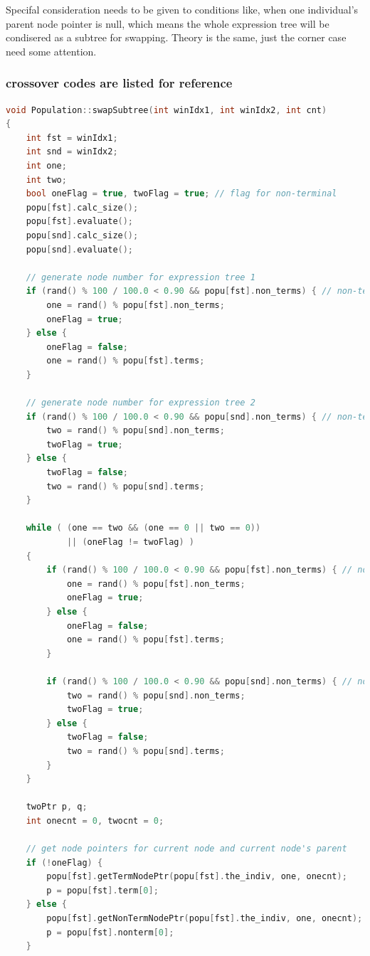 \documentclass[10pt,b5paper]{article}
\begin{document}
Specifal consideration needs to be given to conditions like, when one individual's parent node pointer is null, which means the whole expression tree will be condisered as a subtree for swapping. Theory is the same, just the corner case need some attention. 
\subsubsection{crossover codes are listed for reference}
\label{sec-1-3-2}
\begin{lstlisting}[language=c++]
void Population::swapSubtree(int winIdx1, int winIdx2, int cnt) 
{
    int fst = winIdx1;
    int snd = winIdx2;
    int one;
    int two;
    bool oneFlag = true, twoFlag = true; // flag for non-terminal
    popu[fst].calc_size();
    popu[fst].evaluate();
    popu[snd].calc_size();
    popu[snd].evaluate();

    // generate node number for expression tree 1
    if (rand() % 100 / 100.0 < 0.90 && popu[fst].non_terms) { // non-terminal swap
        one = rand() % popu[fst].non_terms;
        oneFlag = true;  
    } else {    
        oneFlag = false;
        one = rand() % popu[fst].terms;
    }

    // generate node number for expression tree 2
    if (rand() % 100 / 100.0 < 0.90 && popu[snd].non_terms) { // non-terminal swap
        two = rand() % popu[snd].non_terms;
        twoFlag = true;
    } else {    
        twoFlag = false;
        two = rand() % popu[snd].terms;
    }
    
    while ( (one == two && (one == 0 || two == 0))
            || (oneFlag != twoFlag) )
    {
        if (rand() % 100 / 100.0 < 0.90 && popu[fst].non_terms) { // non-terminal swap
            one = rand() % popu[fst].non_terms;
            oneFlag = true;
        } else {    
            oneFlag = false;
            one = rand() % popu[fst].terms;
        }
    
        if (rand() % 100 / 100.0 < 0.90 && popu[snd].non_terms) { // non-terminal swap
            two = rand() % popu[snd].non_terms;
            twoFlag = true;
        } else {    
            twoFlag = false;
            two = rand() % popu[snd].terms;
        }
    }

    twoPtr p, q;
    int onecnt = 0, twocnt = 0;

    // get node pointers for current node and current node's parent
    if (!oneFlag) {        
        popu[fst].getTermNodePtr(popu[fst].the_indiv, one, onecnt);
        p = popu[fst].term[0];
    } else {        
        popu[fst].getNonTermNodePtr(popu[fst].the_indiv, one, onecnt);
        p = popu[fst].nonterm[0];
    }


\end{lstlisting}
\end{document}
